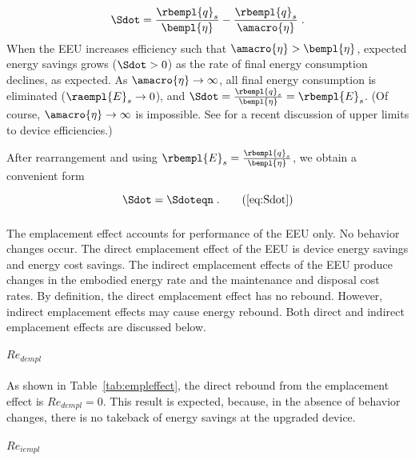 \begin{equation}
  \Sdot = \frac{\rbempl{q}_s}{\bempl{\eta}} - \frac{\rbempl{q}_s}{\amacro{\eta}} \; .
\end{equation}
%
When the EEU increases efficiency such that $\amacro{\eta} > \bempl{\eta}$,
expected energy savings grows ($\Sdot > 0$)
as the rate of final energy consumption declines,
as expected.
As $\amacro{\eta} \rightarrow \infty$,
all final energy consumption is eliminated ($\raempl{E}_s \rightarrow 0$), and
$\Sdot = \frac{\rbempl{q}_s}{\bempl{\eta}} = \rbempl{E}_s$.
(Of course, $\amacro{\eta} \rightarrow \infty$ is impossible. 
See \citet{Paoli:2020aa} for a recent discussion of upper limits to device efficiencies.)

After rearrangement and using $\rbempl{E}_s = \frac{\rbempl{q}_s}{\bempl{\eta}}$, 
we obtain a convenient form

\begin{equation}
  \Sdot = \Sdoteqn \; .  \tag{\ref{eq:Sdot}}
\end{equation}


\subsubsection{\Empleffect{}}
\label{sec:Re_emp}

The emplacement effect accounts for performance of the EEU only.
No behavior changes occur.
The direct emplacement effect of the EEU is device energy savings and energy cost savings.
The indirect emplacement effects of the EEU produce changes in the embodied energy rate and
the maintenance and disposal cost rates.
By definition, the direct emplacement effect has no rebound. 
However, indirect emplacement effects may cause energy rebound.
Both direct and indirect emplacement effects are discussed below.


\paragraph{$Re_{dempl}$}
\label{sec:Re_dempl}

As shown in Table~\ref{tab:empleffect},
the direct rebound from the emplacement effect is
$Re_{dempl} = 0$.
This result is expected, 
because, in the absence of behavior changes,
there is no takeback of energy savings
at the upgraded device.


\paragraph{$Re_{iempl}$} 
\label{sec:Re_iempl}

